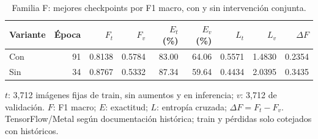\begin{table}[htbp]
\centering
\small
\caption{Familia F: mejores checkpoints por F1 macro, con y sin intervención conjunta.}
\label{tab:regularizacion_checkpoints}
\begin{tabular}{lrrrrrrrr}
\toprule
Variante & Época & $F_t$ & $F_v$ & $E_t$(\%) & $E_v$(\%) & $L_t$ & $L_v$ & $\Delta F$ \\
\midrule
Con & 91 & 0.8138 & 0.5784 & 83.00 & 64.06 & 0.5571 & 1.4830 & 0.2354 \\
Sin & 34 & 0.8767 & 0.5332 & 87.34 & 59.64 & 0.4434 & 2.0395 & 0.3435 \\
\bottomrule
\end{tabular}
\par\smallskip
\parbox{0.97\textwidth}{\footnotesize $t$: 3,712 imágenes fijas de train, sin aumentos y en inferencia; $v$: 3,712 de validación. $F$: F1 macro; $E$: exactitud; $L$: entropía cruzada; $\Delta F=F_t-F_v$. TensorFlow/Metal según documentación histórica; train y pérdidas solo cotejados con históricos.}
\end{table}

